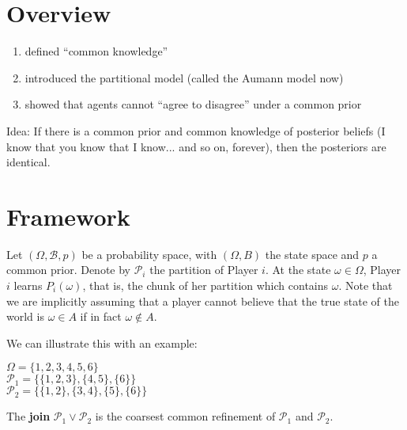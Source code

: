 




\section*{Overview}
\begin{enumerate}
	\item defined ``common knowledge''
	\item introduced the partitional model (called the Aumann model now)
	\item showed that agents cannot ``agree to disagree'' under a common prior
\end{enumerate}

Idea: If there is a common prior and common knowledge of posterior beliefs (I know that you know that I know... and so on, forever), then the posteriors are identical.

\section*{Framework}

Let $(\Omega, \mathcal{B},p)$ be a probability space, with $(\Omega, B)$ the state space and $p$ a common prior.  Denote by $\mathcal{P}_i$ the partition of Player $i$.  At the state $\omega\in\Omega$, Player $i$ learns $P_i(\omega)$, that is, the chunk of her partition which contains $\omega$.  Note that we are implicitly assuming that a player cannot believe that the true state of the world is $\omega\in A$ if in fact $\omega\notin A$.


We can illustrate this with an example:

 $\Omega=\{1,2,3,4,5,6\}$\\$\mathcal{P}_1=\{\{1,2,3\},\{4,5\},\{6\}\}$\\$\mathcal{P}_2=\{\{1,2\},\{3,4\},\{5\},\{6\}\}$
 
 The \textbf{join} $\mathcal{P}_1\lor\mathcal{P}_2$ is the coarsest common refinement of $\mathcal{P}_1$ and $\mathcal{P}_2$.
 
